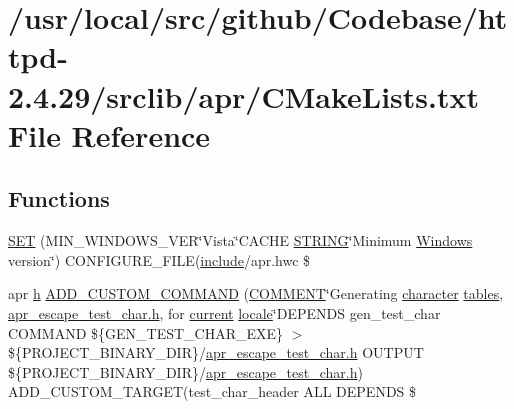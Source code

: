 \hypertarget{srclib_2apr_2CMakeLists_8txt}{}\section{/usr/local/src/github/\+Codebase/httpd-\/2.4.29/srclib/apr/\+C\+Make\+Lists.txt File Reference}
\label{srclib_2apr_2CMakeLists_8txt}
\subsection*{Functions}
\begin{DoxyCompactItemize}
\item 
\hyperlink{srclib_2apr_2CMakeLists_8txt_aac19a32701b900efc64b5427236cc859}{S\+ET} (M\+I\+N\+\_\+\+W\+I\+N\+D\+O\+W\+S\+\_\+\+V\+ER\char`\"{}Vista\char`\"{}C\+A\+C\+HE \hyperlink{pcre__version_8c_ac44504206ba5e7edf67f453407103815}{S\+T\+R\+I\+NG}\char`\"{}Minimum \hyperlink{README_8txt_a82d177673b61f20bcd964ce31b5f71c2}{Windows} version\char`\"{}) C\+O\+N\+F\+I\+G\+U\+R\+E\+\_\+\+F\+I\+LE(\hyperlink{pcregrep_8txt_a5f3af678bb8252fcdc8e42a9cbf654a8}{include}/apr.\+hwc \$
\item 
apr \hyperlink{pcregrep_8txt_a373589baca2cb79ec87f46d6599640b9}{h} \hyperlink{srclib_2apr_2CMakeLists_8txt_a92b1f87aed2bdad368a44d07d9bb0d28}{A\+D\+D\+\_\+\+C\+U\+S\+T\+O\+M\+\_\+\+C\+O\+M\+M\+A\+ND} (\hyperlink{mod__deflate_8c_a180f5b3835bdbfc11b353fd2af5c8659}{C\+O\+M\+M\+E\+NT}\char`\"{}Generating \hyperlink{pcretest_8txt_a519ab140d596a5da5fffad3abf3d5d6d}{character} \hyperlink{pcre_8txt_a0a3ce7ba2875673af4ff52c60636a7cb}{tables}, \hyperlink{pcregrep_8txt_a373589baca2cb79ec87f46d6599640b9}{apr\+\_\+escape\+\_\+test\+\_\+char.\+h}, for \hyperlink{group__APACHE__CORE__CONFIG_ga4b3e87cb39cac2296c5083f27321f1f4}{current} \hyperlink{pcregrep_8txt_abd47f5cbdb1ec8253aaff6092114af6a}{locale}\char`\"{}D\+E\+P\+E\+N\+DS gen\+\_\+test\+\_\+char C\+O\+M\+M\+A\+ND \$\{G\+E\+N\+\_\+\+T\+E\+S\+T\+\_\+\+C\+H\+A\+R\+\_\+\+E\+XE\} $>$ \$\{P\+R\+O\+J\+E\+C\+T\+\_\+\+B\+I\+N\+A\+R\+Y\+\_\+\+D\+IR\}/\hyperlink{pcregrep_8txt_a373589baca2cb79ec87f46d6599640b9}{apr\+\_\+escape\+\_\+test\+\_\+char.\+h} O\+U\+T\+P\+UT \$\{P\+R\+O\+J\+E\+C\+T\+\_\+\+B\+I\+N\+A\+R\+Y\+\_\+\+D\+IR\}/\hyperlink{pcregrep_8txt_a373589baca2cb79ec87f46d6599640b9}{apr\+\_\+escape\+\_\+test\+\_\+char.\+h}) A\+D\+D\+\_\+\+C\+U\+S\+T\+O\+M\+\_\+\+T\+A\+R\+G\+ET(test\+\_\+char\+\_\+header A\+LL D\+E\+P\+E\+N\+DS \$

\end{DoxyCompactItemize}
